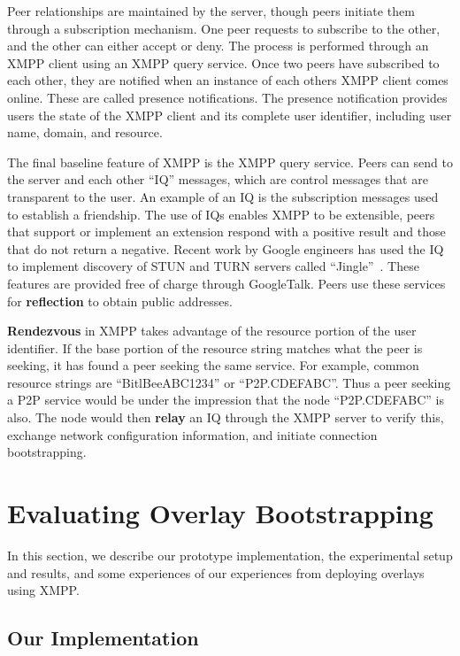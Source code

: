 \documentclass[conference]{IEEEtran}
\begin{document}
Peer relationships are maintained by the server, though peers initiate them
through a subscription mechanism.  One peer requests to subscribe to the other,
and the other can either accept or deny.  The process is performed through an
XMPP client using an XMPP query service.  Once two peers have subscribed to
each other, they are notified when an instance of each others XMPP client comes
online.  These are called presence notifications.  The presence notification
provides users the state of the XMPP client and its complete user identifier,
including user name, domain, and resource.

The final baseline feature of XMPP is the XMPP query service.  Peers can send
to the server and each other ``IQ'' messages, which are control messages that
are transparent to the user.  An example of an IQ is the subscription messages
used to establish a friendship.  The use of IQs enables XMPP to be extensible,
peers that support or implement an extension respond with a positive result and
those that do not return a negative.  Recent work by Google engineers has used
the IQ to implement discovery of STUN and TURN servers called
``Jingle''~\cite{jingle}.  These features are provided free of charge through
GoogleTalk.  Peers use these services for \textbf{reflection} to obtain public
addresses.

\textbf{Rendezvous} in XMPP takes advantage of the resource portion of the user
identifier.  If the base portion of the resource string matches what the peer
is seeking, it has found a peer seeking the same service.  For example, common
resource strings are ``BitlBeeABC1234'' or ``P2P.CDEFABC''.  Thus a peer
seeking a P2P service would be under the impression that the node
``P2P.CDEFABC'' is also.  The node would then \textbf{relay} an IQ through the
XMPP server to verify this, exchange network configuration information, and
initiate connection bootstrapping.

\section{Evaluating Overlay Bootstrapping}
\label{evaluations}
In this section, we describe our prototype implementation, the experimental
setup and results, and some experiences of our experiences from deploying
overlays using XMPP.

\subsection{Our Implementation}
\end{document}
